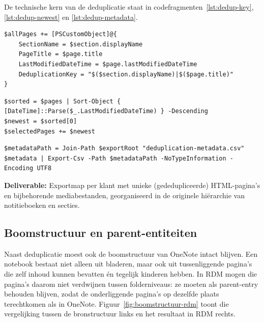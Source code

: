 De technische kern van de deduplicatie staat in codefragmenten~\ref{lst:dedup-key}, \ref{lst:dedup-newest} en \ref{lst:dedup-metadata}.

\begin{listing}[htbp]
\begin{lstlisting}
$allPages += [PSCustomObject]@{
    SectionName = $section.displayName
    PageTitle = $page.title
    LastModifiedDateTime = $page.lastModifiedDateTime
    DeduplicationKey = "$($section.displayName)|$($page.title)"
}
\end{lstlisting}
\caption{Opbouw van een deduplicatiesleutel per OneNote-pagina}
\label{lst:dedup-key}
\end{listing}

\begin{listing}[htbp]
\begin{lstlisting}
$sorted = $pages | Sort-Object { [DateTime]::Parse($_.LastModifiedDateTime) } -Descending
$newest = $sorted[0]
$selectedPages += $newest
\end{lstlisting}
\caption{Selectie van de nieuwste versie bij duplicaten}
\label{lst:dedup-newest}
\end{listing}

\begin{listing}[htbp]
\begin{lstlisting}
$metadataPath = Join-Path $exportRoot "deduplication-metadata.csv"
$metadata | Export-Csv -Path $metadataPath -NoTypeInformation -Encoding UTF8
\end{lstlisting}
\caption{Wegschrijven van deduplicatie-metadata voor controle en audit}
\label{lst:dedup-metadata}
\end{listing}

\textbf{Deliverable:} Exportmap per klant met unieke (gededupliceerde) HTML-pagina's en bijbehorende mediabestanden, georganiseerd in de originele hiërarchie van notitieboeken en secties.

\subsection{Boomstructuur en parent-entiteiten}
\label{subsec:boomstructuur}

Naast deduplicatie moest ook de boomstructuur van OneNote intact blijven. Een notebook bestaat niet alleen uit bladeren, maar ook uit tussenliggende pagina's die zelf inhoud kunnen bevatten én tegelijk kinderen hebben. In RDM mogen die pagina's daarom niet verdwijnen tussen folderniveaus: ze moeten als parent-entry behouden blijven, zodat de onderliggende pagina's op dezelfde plaats terechtkomen als in OneNote. Figuur~\ref{fig:boomstructuur-rdm} toont die vergelijking tussen de bronstructuur links en het resultaat in RDM rechts.


